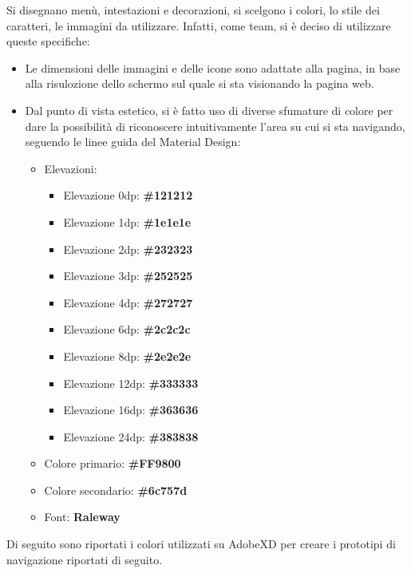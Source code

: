Si disegnano menù, intestazioni e decorazioni, si scelgono i colori, lo stile dei 
caratteri, le immagini da utilizzare. Infatti, come team, si è deciso di utilizzare 
queste specifiche:
\begin{itemize}
	\item Le dimensioni delle immagini e delle icone sono adattate alla pagina, in base 
	alla risulozione dello schermo sul quale si sta visionando la pagina web.
	\item Dal punto di vista estetico, si è fatto uso di diverse sfumature di colore per 
	dare la possibilità di riconoscere intuitivamente l'area su cui si sta navigando, 
	seguendo le linee guida del Material Design:
	\begin{itemize}
		\item Elevazioni:
		\begin{itemize}
			\item Elevazione 0dp: \textbf{\#121212} 
			\item Elevazione 1dp: \textbf{\#1e1e1e}
			\item Elevazione 2dp: \textbf{\#232323}
			\item Elevazione 3dp: \textbf{\#252525}
			\item Elevazione 4dp: \textbf{\#272727}
			\item Elevazione 6dp: \textbf{\#2c2c2c}
			\item Elevazione 8dp: \textbf{\#2e2e2e}
			\item Elevazione 12dp: \textbf{\#333333}
			\item Elevazione 16dp: \textbf{\#363636}
			\item Elevazione 24dp: \textbf{\#383838}
		\end{itemize} 
		\item Colore primario: \textbf{\#FF9800}
		\item Colore secondario: \textbf{\#6c757d}
		\item Font: \textbf{Raleway} 
	\end{itemize}
\end{itemize}
Di seguito sono riportati i colori utilizzati su AdobeXD per creare i prototipi di 
navigazione riportati di seguito.

